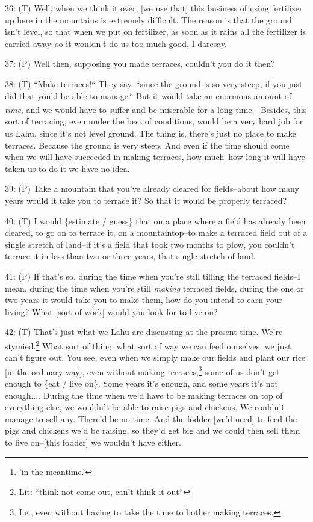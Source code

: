 36: (T) Well, when we think it over, [we use that] this business of using fertilizer
up here in the mountains is extremely difficult. The reason is that the ground
isn't level, so that when we put on fertilizer, as soon as it rains all the fertilizer
is carried away--so it wouldn't do us too much good, I daresay.

37: (P) Well then, supposing you made terraces, couldn't you do it then?

38: (T) ``Make terraces!`` They say--``since the ground
is so very steep, if you just did that you'd be able to manage.`` But it
would take an enormous amount of \textit{time}, and we would have to suffer and
be miserable for a long time.\footnote{'in the meantime.'} Besides, this sort of terracing, even under the
best of conditions, would be a very hard job for us Lahu, since it's not level
ground. The thing is, there's just no place to make terraces. Because the ground
is very steep. And even if the time should come when we will have succeeded in
making terraces, how much--how long it will have taken us to do it we have no idea.

39: (P) Take a mountain that you've already cleared for fields--about how many
years would it take you to terrace it? So that it would be properly terraced?

40: (T) I would \{estimate / guess\} that on a place where a field has already
been cleared, to go on to terrace it, on a mountaintop--to make a terraced field
out of a single stretch of land--if it's a field that took two months to plow,
you couldn't terrace it in less than two or three years, that single stretch of
land.

41: (P) If that's so, during the time when you're still tilling the terraced fields--I
mean, during the time when you're still \textit{making} terraced fields, during
the one or two years it would take you to make them, how do you intend to earn
your living? What [sort of work] would you look for to live on?

42: (T) That's just what we Lahu are discussing at the present time. We're stymied.\footnote{Lit: ``think not come out, can't think it out``}
What sort of thing, what sort of way we can feed ourselves, we just can't figure
out. You see, even when we simply make our fields and plant our rice [in the ordinary
way], even without making terraces,\footnote{I.e., even without having to take the time to bother making terraces.} some of us don't get enough to \{eat /
live on\}. Some years it's enough, and some years it's not enough.... During the
time when we'd have to be making terraces on top of everything else, we wouldn't
be able to raise pigs and chickens. We couldn't manage to sell any. There'd be
no time. And the fodder [we'd need] to feed the pigs and chickens we'd be raising,
so they'd get big and we could then sell them to live on--[this fodder] we wouldn't
have either.

